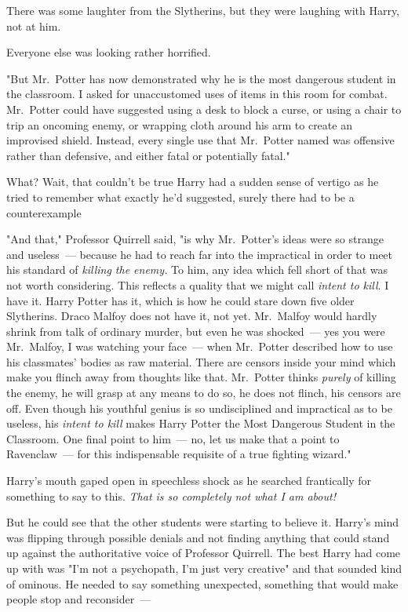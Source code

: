 There was some laughter from the Slytherins, but they were laughing with Harry,
not at him.

Everyone else was looking rather horrified.

"But Mr.~Potter has now demonstrated why he is the most dangerous student in
the classroom. I asked for unaccustomed uses of items in this room for combat.
Mr.~Potter could have suggested using a desk to block a curse, or using a chair
to trip an oncoming enemy, or wrapping cloth around his arm to create an
improvised shield. Instead, every single use that Mr.~Potter named was
offensive rather than defensive, and either fatal or potentially fatal."

What? Wait, that couldn't be true{\el} Harry had a sudden sense of vertigo
as he tried to remember what exactly he'd suggested, surely there had to be a
counterexample{\el}

"And that," Professor Quirrell said, "is why Mr.~Potter's ideas were so strange
and useless~--- because he had to reach far into the impractical in order to meet
his standard of \emph{killing the enemy.} To him, any idea which fell short of
that was not worth considering. This reflects a quality that we might call
\emph{intent to kill}. I have it. Harry Potter has it, which is how he could
stare down five older Slytherins. Draco Malfoy does not have it, not yet.
Mr.~Malfoy would hardly shrink from talk of ordinary murder, but even he was
shocked~--- yes you were Mr.~Malfoy, I was watching your face~--- when Mr.~Potter
described how to use his classmates' bodies as raw material. There are censors
inside your mind which make you flinch away from thoughts like that. Mr.~Potter
thinks \emph{purely} of killing the enemy, he will grasp at any means to do so,
he does not flinch, his censors are off. Even though his youthful genius is so
undisciplined and impractical as to be useless, his \emph{intent to kill} makes
Harry Potter the Most Dangerous Student in the Classroom. One final point to
him~--- no, let us make that a point to Ravenclaw~--- for this indispensable
requisite of a true fighting wizard."

Harry's mouth gaped open in speechless shock as he searched frantically for
something to say to this. \emph{That is so completely not what I am about!}

But he could see that the other students were starting to believe it. Harry's
mind was flipping through possible denials and not finding anything that could
stand up against the authoritative voice of Professor Quirrell. The best Harry
had come up with was "I'm not a psychopath, I'm just very creative" and that
sounded kind of ominous. He needed to say something unexpected, something that
would make people stop and reconsider~---

